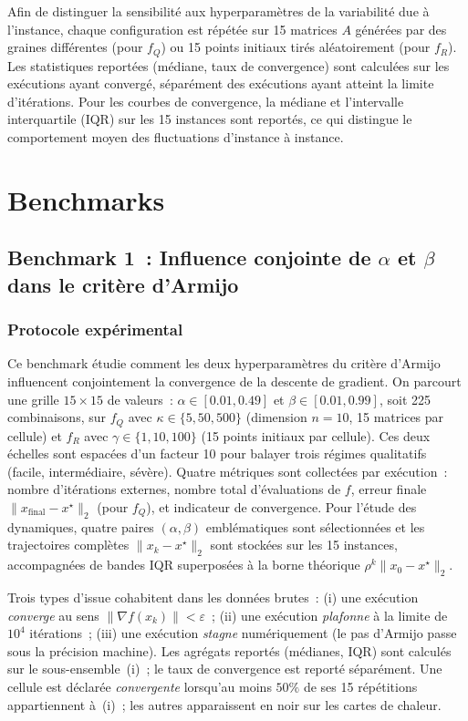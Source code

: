 \documentclass[10pt,a4paper]{article}
\begin{document}
Afin de distinguer la sensibilité aux hyperparamètres de la variabilité due à l'instance, chaque configuration est répétée sur 15 matrices $A$ générées par des graines différentes (pour $f_Q$) ou 15 points initiaux tirés aléatoirement (pour $f_R$). Les statistiques reportées (médiane, taux de convergence) sont calculées sur les exécutions ayant convergé, séparément des exécutions ayant atteint la limite d'itérations. Pour les courbes de convergence, la médiane et l'intervalle interquartile (IQR) sur les 15 instances sont reportés, ce qui distingue le comportement moyen des fluctuations d'instance à instance.

\newpage

\section{Benchmarks}

\subsection{Benchmark 1~: Influence conjointe de $\alpha$ et $\beta$ dans le critère d'Armijo}\label{sec:b1}

\subsubsection{Protocole expérimental}

Ce benchmark étudie comment les deux hyperparamètres du critère d'Armijo influencent conjointement la convergence de la descente de gradient. On parcourt une grille $15 \times 15$ de valeurs~: $\alpha \in [0.01, 0.49]$ et $\beta \in [0.01, 0.99]$, soit 225 combinaisons, sur $f_Q$ avec $\kappa \in \{5, 50, 500\}$ (dimension $n=10$, 15 matrices par cellule) et $f_R$ avec $\gamma \in \{1, 10, 100\}$ (15 points initiaux par cellule). Ces deux échelles sont espacées d'un facteur 10 pour balayer trois régimes qualitatifs (facile, intermédiaire, sévère). Quatre métriques sont collectées par exécution~: nombre d'itérations externes, nombre total d'évaluations de $f$, erreur finale $\|x_{\text{final}} - x^\star\|_2$ (pour $f_Q$), et indicateur de convergence. Pour l'étude des dynamiques, quatre paires $(\alpha, \beta)$ emblématiques sont sélectionnées et les trajectoires complètes $\|x_k - x^\star\|_2$ sont stockées sur les 15 instances, accompagnées de bandes IQR superposées à la borne théorique $\rho^k\|x_0-x^\star\|_2$.

Trois types d'issue cohabitent dans les données brutes~: (i) une exécution \emph{converge} au sens $\|\nabla f(x_k)\| < \varepsilon$~; (ii) une exécution \emph{plafonne} à la limite de $10^4$ itérations~; (iii) une exécution \emph{stagne} numériquement (le pas d'Armijo passe sous la précision machine). Les agrégats reportés (médianes, IQR) sont calculés sur le sous-ensemble~(i)~; le taux de convergence est reporté séparément. Une cellule est déclarée \emph{convergente} lorsqu'au moins $50\%$ de ses 15 répétitions appartiennent à~(i)~; les autres apparaissent en noir sur les cartes de chaleur.
\end{document}
